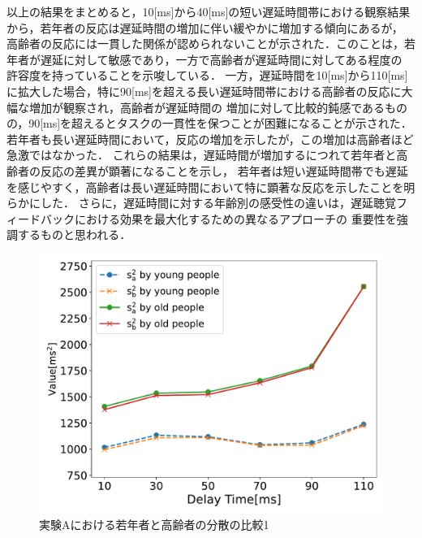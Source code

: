 以上の結果をまとめると，10[ms]から40[ms]の短い遅延時間帯における観察結果から，若年者の反応は遅延時間の増加に伴い緩やかに増加する傾向にあるが，
高齢者の反応には一貫した関係が認められないことが示された．このことは，若年者が遅延に対して敏感であり，一方で高齢者が遅延時間に対してある程度の
許容度を持っていることを示唆している．
一方，遅延時間を10[ms]から110[ms]に拡大した場合，特に90[ms]を超える長い遅延時間帯における高齢者の反応に大幅な増加が観察され，高齢者が遅延時間の
増加に対して比較的鈍感であるものの，90[ms]を超えるとタスクの一貫性を保つことが困難になることが示された．
若年者も長い遅延時間において，反応の増加を示したが，この増加は高齢者ほど急激ではなかった．
これらの結果は，遅延時間が増加するにつれて若年者と高齢者の反応の差異が顕著になることを示し，
若年者は短い遅延時間帯でも遅延を感じやすく，高齢者は長い遅延時間において特に顕著な反応を示したことを明らかにした．
さらに，遅延時間に対する年齢別の感受性の違いは，遅延聴覚フィードバックにおける効果を最大化するための異なるアプローチの
重要性を強調するものと思われる．
\begin{figure}[tbp]
  \centering
  \includegraphics[scale=0.5]{figures/Honbann/Comparison_young_old/110_var_SaSb.pdf}
  \caption{実験Aにおける若年者と高齢者の分散の比較1}
  \label{fig:Var_110ms_Sa_Sb}
\end{figure}
